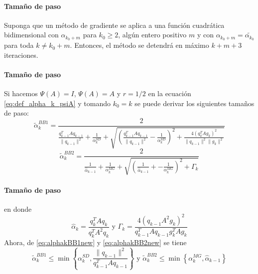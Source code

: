 \begin{frame}{\insertsectionhead}
    \framesubtitle{Tamaño de paso}
    \begin{corollary}
        Suponga que un método de gradiente se aplica a una función cuadrática bidimensional con $\alpha_{k_0+m}$ para $k_0\geq 2$, algún entero positivo $m$ y con $\alpha_{k_0+m}= \tilde{\alpha_{k_0}}$ para toda $k\neq k_0+m$. Entonces, el método se detendrá en máximo $k+m+3$ iteraciones.
    \end{corollary}
\end{frame}

\begin{frame}{\insertsectionhead}
    \framesubtitle{Tamaño de paso}
    Si hacemos $\Psi(A)= I$, $\Psi(A)= A$ y $r=1/2$ en la ecuación \ref{eq:def_alpha_k_psiA} y tomando $k_0=k$ se puede derivar los siguientes tamaños de paso:
    \begin{equation}
        \tilde{\alpha}_k^{BB1} = \frac{2}{\frac{q_{k-1}^TAq_{k-1}}{\|q_{k-1}\|^2} + \frac{1}{\alpha_k^{SD}}+\sqrt{ \left(\frac{q_{k-1}^TAq_{k-1}}{\|q_{k-1}\|^2} -\frac{1}{\alpha_{k}^{SD}} \right)^2 + \frac{4\left(q_k^TAg_k\right)^2}{\|q_{k-1}\|^2\|g_k\|^2} }}
        \label{eq:alphakBB1new}
    \end{equation}
    \begin{equation}
        \tilde{\alpha}_k^{BB2} = \frac{2}{\frac{1}{\hat{\alpha}_{k-1}} +\frac{1}{\alpha_k^{MG}} + \sqrt{\left( \frac{1}{\hat{\alpha}_{k-1}}+ - \frac{1}{\alpha_k^{MG}}  \right) ^2 + \Gamma_k} }
        \label{eq:alphakBB2new}
    \end{equation}
\end{frame}

\begin{frame}{\insertsectionhead}
    \framesubtitle{Tamaño de paso}
    en donde
    \begin{equation}
        \hat{\alpha}_k = \frac{q_k^TAq_k}{q_k^TA^2q_k} \text{ \ y \ } \Gamma_k = \frac{4\left(q_{k-1}A^2g_k\right)^2}{q_{k-1}^TAq_{k-1}g_k^TAg_k}
    \end{equation}
    Ahora, de \ref{eq:alphakBB1new} y \ref{eq:alphakBB2new} se tiene
    \begin{equation}
        \tilde{\alpha}_k^{BB1}\leq\min{\left\{\alpha_k^{SD}, \frac{\|q_{k-1}\|^2}{q_{k-1}^{T}Aq_{k-1}}\right\}} \text{ \ y \ } \tilde{\alpha}_k^{BB2}\leq \min{\left\{\alpha_k^{MG}, \hat{\alpha}_{k-1}\right\}} \label{eq:alphabounds}
    \end{equation}
\end{frame}

